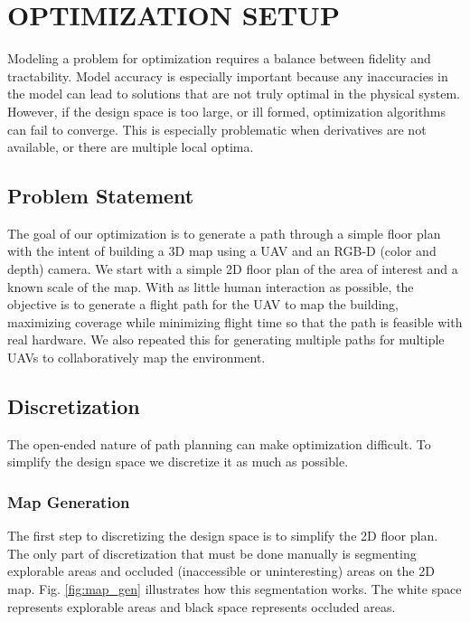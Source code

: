 \documentclass[letterpaper, 10 pt, conference]{ieeeconf}  %
\begin{document}
\section{OPTIMIZATION SETUP}\label{setup}

Modeling a problem for optimization requires a balance between fidelity and tractability. Model accuracy is especially important because any inaccuracies in the model can lead to solutions that are not truly optimal in the physical system. However, if the design space is too large, or ill formed, optimization algorithms can fail to converge. This is especially problematic when derivatives are not available, or there are multiple local optima.

\subsection{Problem Statement}


The goal of our optimization is to generate a path through a simple floor plan with the intent of building a 3D map using a UAV and an RGB-D (color and depth) camera. We start with a simple 2D floor plan of the area of interest and a known scale of the map. With as little human interaction as possible, the objective is to generate a flight path for the UAV to map the building, maximizing coverage while minimizing flight time so that the path is feasible with real hardware. We also repeated this for generating multiple paths for multiple UAVs to collaboratively map the environment.

\subsection{Discretization}

The open-ended nature of path planning can make optimization difficult. To simplify the design space we discretize it as much as possible.

\subsubsection{Map Generation}

The first step to discretizing the design space is to simplify the 2D floor plan. The only part of discretization that must be done manually is segmenting explorable areas and occluded (inaccessible or uninteresting) areas on the 2D map. Fig. \ref{fig:map_gen} illustrates how this segmentation works. The white space represents explorable areas and black space represents occluded areas.
\end{document}
